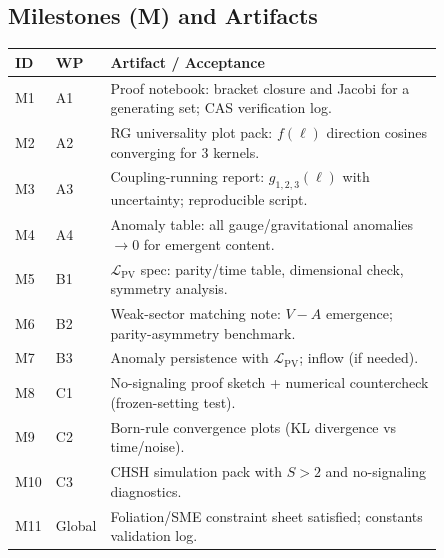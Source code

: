 \documentclass[smallextended]{svjour3}       %
\begin{document}
    \subsection*{Milestones (M) and Artifacts}
    \begin{center}
    \begin{tabular}{llp{0.85\linewidth}}
    \hline
    \textbf{ID} & \textbf{WP} & \textbf{Artifact / Acceptance} \\
    \hline
    M1 & A1 & Proof notebook: bracket closure and Jacobi for a generating set; CAS verification log. \\
    M2 & A2 & RG universality plot pack: $f(\ell)$ direction cosines converging for 3 kernels. \\
    M3 & A3 & Coupling-running report: $g_{1,2,3}(\ell)$ with uncertainty; reproducible script. \\
    M4 & A4 & Anomaly table: all gauge/gravitational anomalies $\to 0$ for emergent content. \\
    M5 & B1 & $\mathcal{L}_{\mathrm{PV}}$ spec: parity/time table, dimensional check, symmetry analysis. \\
    M6 & B2 & Weak-sector matching note: $V\!-\!A$ emergence; parity-asymmetry benchmark. \\
    M7 & B3 & Anomaly persistence with $\mathcal{L}_{\mathrm{PV}}$; inflow (if needed). \\
    M8 & C1 & No-signaling proof sketch + numerical countercheck (frozen-setting test). \\
    M9 & C2 & Born-rule convergence plots (KL divergence vs time/noise). \\
    M10 & C3 & CHSH simulation pack with $S>2$ and no-signaling diagnostics. \\
    M11 & Global & Foliation/SME constraint sheet satisfied; constants validation log. \\
    \hline
    \end{tabular}
    \end{center}


    
\end{document}
